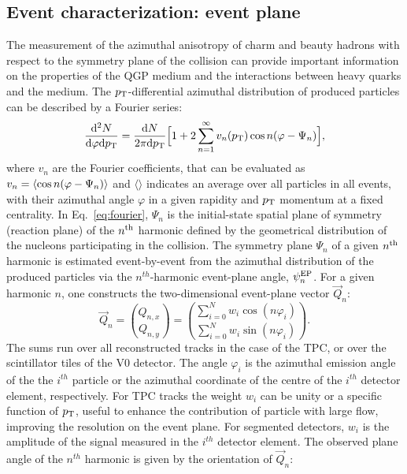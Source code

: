 \subsection{Event characterization: event plane}
\label{sec:EventPlane}
The measurement of the azimuthal anisotropy of charm and beauty hadrons
with respect to the symmetry plane of the collision can provide important information on the properties of the QGP medium 
and the interactions between heavy quarks and the medium.
The $p_{\rm T}$-differential azimuthal distribution of produced particles can be described by a Fourier series:
\begin{equation}
\label{eq:fourier}
\frac{{\rm d}^2N}{{\rm d} \varphi {\rm d}p_{\rm T}} =  \frac{{\rm d}N}{2\pi {\rm d}p_{\rm T}} \Big [ 1+ 2 \sum_{n=1}^{\infty} v_n(p_{\rm T}) \,{\rm cos} \,n(\varphi- \Psi_n)\Big ], 
\end{equation}
where $v_n$ are the Fourier coefficients, that can be evaluated as 
$v_n = \langle {\rm cos} \, n(\varphi - \Psi_n)\rangle$ and $\langle \rangle$ indicates an average over 
 all particles in all events, with their azimuthal angle $\varphi$ in a given rapidity and $p_{\rm T}$ 
 momentum at a fixed centrality. In Eq.~\ref{eq:fourier},
$\Psi_n$ is the initial-state spatial plane of symmetry (reaction plane) of
 the $n^{\rm th}$ harmonic defined by the geometrical distribution of the nucleons participating in the collision.
The symmetry plane $\Psi_n$ of a given $n^{\rm th}$ harmonic is estimated 
 event-by-event from the azimuthal distribution of the produced particles
via the $n^{th}$-harmonic event-plane angle, $\psi_n^{\rm EP}$.
For a given harmonic $n$, one constructs the two-dimensional event-plane 
vector $\vec{Q}_n$:
\begin{equation}
\label{eq:qvector}
 \vec{Q}_n= {Q_{n,x} \choose Q_{n,y}} = {\sum_{i=0}^{N} w_i \cos (n\varphi_i) \choose \sum_{i=0}^{N} w_i \sin (n\varphi_i)}.
\end{equation}
The sums run over all reconstructed tracks in the case 
of the TPC, or over the scintillator tiles of the V0 detector.
The angle $\varphi_i$ is the azimuthal emission angle of the the $i^{th}$ particle or the 
azimuthal coordinate of the centre of the $i^{th}$ detector element, respectively. 
For TPC tracks the weight $w_i$ can be unity or a specific 
function of $p_{\rm T}$, useful to enhance the 
contribution of particle with large flow, improving 
the resolution on the event plane. For segmented detectors, $w_i$ is the amplitude of the 
signal measured in the $i^{th}$ detector element. The observed plane 
angle of the $n^{th}$ harmonic is given by the orientation of $\vec{Q}_n$:
